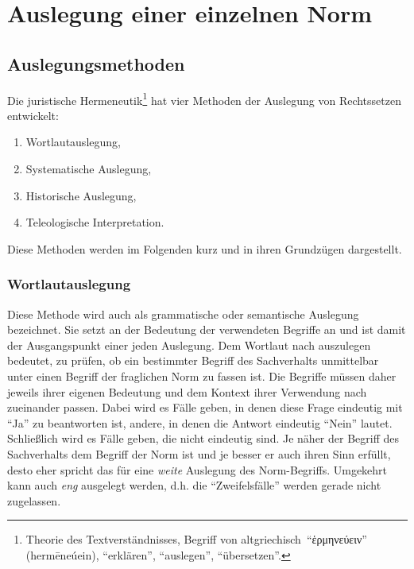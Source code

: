 \section{Auslegung einer einzelnen Norm}
\subsection{Auslegungsmethoden}
Die juristische Hermeneutik\footnote{Theorie des Textverständnisses, Begriff von altgriechisch \enquote{ἑρμηνεύειν} (hermēneúein), \enquote{erklären}, \enquote{auslegen}, \enquote{übersetzen}.} hat vier Methoden der Auslegung von Rechtssetzen entwickelt:
\begin{enumerate}
\item Wortlautauslegung,
\item Systematische Auslegung,
\item Historische Auslegung,
\item Teleologische Interpretation.
\end{enumerate}

Diese Methoden werden im Folgenden kurz und in ihren Grundzügen dargestellt.

\subsubsection{Wortlautauslegung}
Diese Methode wird auch als grammatische oder semantische Auslegung bezeichnet. Sie setzt an der Bedeutung der verwendeten Begriffe an und ist damit der Ausgangspunkt einer jeden Auslegung. Dem Wortlaut nach auszulegen bedeutet, zu prüfen, ob ein bestimmter Begriff des Sachverhalts unmittelbar unter einen Begriff der fraglichen Norm zu fassen ist. Die Begriffe müssen daher jeweils ihrer eigenen Bedeutung und dem Kontext ihrer Verwendung nach zueinander passen. Dabei wird es Fälle geben, in denen diese Frage eindeutig mit \enquote{Ja} zu beantworten ist, andere, in denen die Antwort eindeutig \enquote{Nein} lautet. Schließlich wird es Fälle geben, die nicht eindeutig sind. Je näher der Begriff des Sachverhalts dem Begriff der Norm ist und je besser er auch ihren Sinn erfüllt, desto eher spricht das für eine \emph{weite} Auslegung des Norm-Begriffs. Umgekehrt kann auch \emph{eng} ausgelegt werden, d.h. die \enquote{Zweifelsfälle} werden gerade nicht zugelassen.


